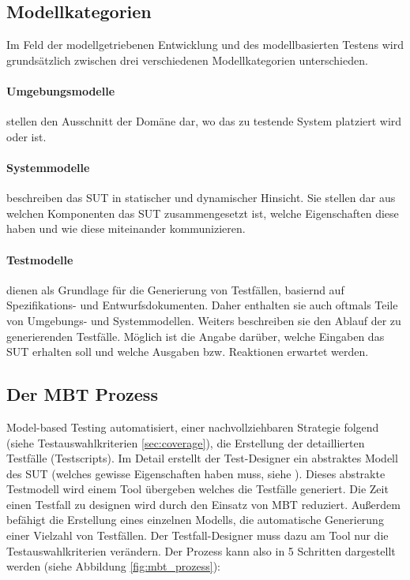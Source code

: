 \subsection{Modellkategorien}
Im Feld der modellgetriebenen Entwicklung und des modellbasierten Testens wird grundsätzlich zwischen drei verschiedenen Modellkategorien unterschieden.

\paragraph{Umgebungsmodelle} stellen den Ausschnitt der Domäne dar, wo das zu testende System platziert wird oder ist.
\paragraph{Systemmodelle} beschreiben das SUT in statischer und dynamischer Hinsicht. Sie stellen dar aus welchen Komponenten das SUT zusammengesetzt ist, welche Eigenschaften diese haben und wie diese miteinander kommunizieren. 
\paragraph{Testmodelle} dienen als Grundlage für die Generierung von Testfällen, basiernd auf Spezifikations- und Entwurfsdokumenten. Daher enthalten sie auch oftmals Teile von Umgebungs- und Systemmodellen. Weiters beschreiben sie den Ablauf der zu generierenden Testfälle. Möglich ist die Angabe darüber, welche Eingaben das SUT erhalten soll und welche Ausgaben bzw. Reaktionen erwartet werden.

\subsection{Der MBT Prozess}
Model-based Testing automatisiert, einer nachvollziehbaren Strategie folgend (siehe Testauswahlkriterien \ref{sec:coverage}), die Erstellung der detaillierten Testfälle (Testscripts).
Im Detail erstellt der Test-Designer ein abstraktes Modell des SUT (welches gewisse Eigenschaften haben muss, siehe ). Dieses abstrakte Testmodell wird einem Tool übergeben welches die Testfälle generiert. Die Zeit einen Testfall zu designen wird durch den Einsatz von MBT reduziert. Außerdem befähigt die Erstellung eines einzelnen Modells, die automatische Generierung einer Vielzahl von Testfällen. Der Testfall-Designer muss dazu am Tool nur die Testauswahlkriterien verändern. \cite{utting_practical_2007} Der Prozess kann also in 5 Schritten dargestellt werden (siehe Abbildung \ref{fig:mbt_prozess}):

